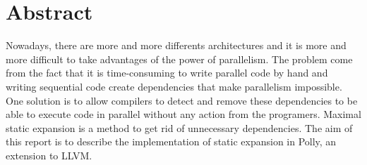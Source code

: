 \begingroup
\let\clearpage\relax
\let\cleardoublepage\relax
\let\cleardoublepage\relax

\chapter*{Abstract}
Nowadays, there are more and more differents architectures and it is more and more difficult to take advantages of the power of parallelism. The problem come from the fact that it is time-consuming to write parallel code by hand and writing sequential code create dependencies that make parallelism impossible. One solution is to allow compilers to detect and remove these dependencies to be able to execute code in parallel without any action from the programers. Maximal static expansion is a method to get rid of unnecessary dependencies. The aim of this report is to describe the implementation of static expansion in Polly, an extension to LLVM.

\vfill

\endgroup			

\vfill